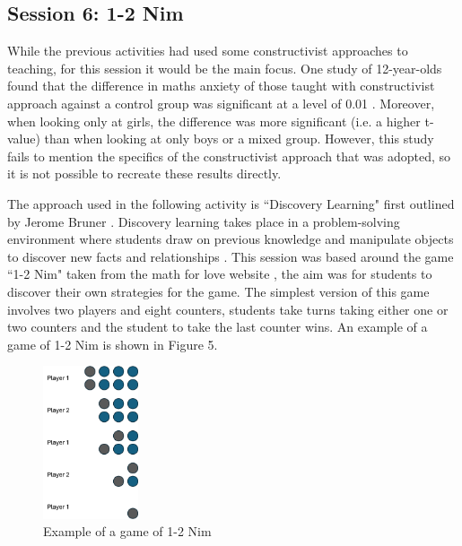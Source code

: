 \documentclass[11pt, a4paper, notitlepage]{article}
\begin{document}
\subsection{Session 6: 1-2 Nim}
While the previous activities had used some constructivist approaches to teaching, for this session it would be the main focus. One study of 12-year-olds found that the difference in maths anxiety of those taught with constructivist approach against a control group was significant at a level of 0.01 \cite{Suman:2021}. Moreover, when looking only at girls, the difference was more significant (i.e. a higher t-value) than when looking at only boys or a mixed group. However, this study fails to mention the specifics of the constructivist approach that was adopted, so it is not possible to recreate these results directly. 
\par
The approach used in the following activity is ``Discovery Learning" first outlined by Jerome Bruner \cite{Bruner:1961}. Discovery learning takes place in a problem-solving environment where students draw on previous knowledge and manipulate objects to discover new facts and relationships \cite{learning-theories:Discovery-learning}. This session was based around the game ``1-2 Nim" taken from the math for love website \cite{1-2Nim}, the aim was for students to discover their own strategies for the game. The simplest version of this game involves two players and eight counters, students take turns taking either one or two counters and the student to take the last counter wins. An example of a game of 1-2 Nim is shown in Figure 5.
\par
\begin{figure}[htbp]
    \centering
    \includegraphics[width=0.25\textwidth]{Images/1-2Nim_example.png}
    \caption{Example of a game of 1-2 Nim}
    \end{figure}
\end{document}
